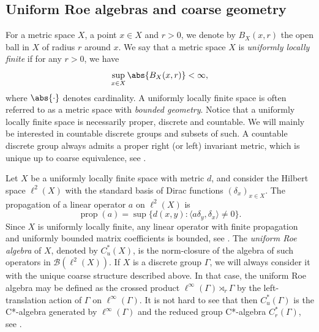 \documentclass[12pt, a4paper, oneside]{amsart}
\newcommand{\0}{\mathbf{0}}
\newcommand{\1}{\mathbf{1}}
\newcommand{\B}{\mathscr{B}}
\begin{document}
	\subsection{Uniform Roe algebras and coarse geometry}
	
	For a metric space \(X\), a point \(x \in X\) and \(r > 0\), we denote by \(B_X(x, r)\) the open ball in \(X\) of radius \(r\) around \(x\). We say that a metric space \(X\) is \textit{uniformly locally finite} if for any \(r > 0\), we have \[\sup_{x \in X} \abs{B_X(x, r)} < \infty,\] where \(\abs{\cdot} \) denotes cardinality. A uniformly locally finite space is often referred to as a metric space with \textit{bounded geometry}. Notice that a uniformly locally finite space is necessarily proper, discrete and countable. We will mainly be interested in countable discrete groups and subsets of such. A countable discrete group always admits a proper right (or left) invariant metric, which is unique up to coarse equivalence, see \cite[Proposition 5.5.2]{brown_ozawa}. 
	
	Let \(X\) be a uniformly locally finite space with metric \(d\), and consider the Hilbert space \(\ell^2(X)\) with the standard basis of Dirac functions \((\delta_x)_{x \in X}\). The propagation of a linear operator \(a\) on \(\ell^2(X)\) is \[\operatorname{prop}(a) = \sup \{ d(x, y) : \langle a \delta_y, \delta_x \rangle \neq 0\}.\] Since \(X\) is uniformly locally finite, any linear operator with finite propagation and uniformly bounded matrix coefficients is bounded, see \cite[Lemma 8.1]{winter}. The \textit{uniform Roe algebra} of \(X\), denoted by \(C_u^*(X)\), is the norm-closure of the algebra of such operators in \(\B(\ell^2(X))\). If \(X\) is a discrete group \(\Gamma\), we will always consider it with the unique coarse structure described above. In that case, the uniform Roe algebra may be defined as the crossed product \(\ell^\infty(\Gamma) \rtimes_r \Gamma\) by the left-translation action of \(\Gamma\) on \(\ell^\infty(\Gamma)\). It is not hard to see that then \(C_u^*(\Gamma)\) is the C*-algebra generated by \(\ell^\infty(\Gamma)\) and the reduced group C*-algebra \(C_r^*(\Gamma)\), see \cite[Proposition 5.1.3]{brown_ozawa}. 
	
\end{document}

